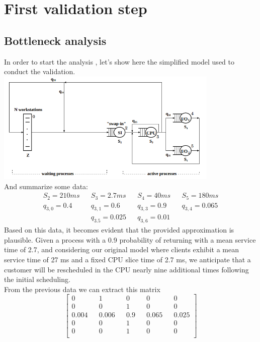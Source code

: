 \documentclass[12pt,a4paper]{article}
\begin{document}
    \section{First validation step}
    \subsection{Bottleneck analysis}
    In order to start the analysis , let's show here the simplified model 
    used to conduct the validation.
    \includegraphics[width=0.8\textwidth]{Images/simplified_model.png}
    \\And summarize some data:
    \begin{displaymath}
        \begin{aligned}
        S_2 = 210ms && S_3= 2.7ms && S_4 = 40ms && S_5=180ms\\
        q_{3,0}= 0.4&& q_{3,1}=0.6 && q_{3,3} = 0.9 && q_{3,4}= 0.065\\
        && q_{3.5}= 0.025 && q_{3,6}=0.01 && 
        \end{aligned}
    \end{displaymath}
    Based on this data, it becomes evident that the provided approximation is plausible. Given a process with a 0.9 probability of returning with a mean service time of 2.7, and considering our original model where clients exhibit a mean service time of 27 ms and a fixed CPU slice time of 2.7 ms, we anticipate that a customer will be rescheduled in the CPU nearly nine additional times following the initial scheduling. \\

    From the previous data we can extract this matrix 
    \begin{displaymath}
        \begin{bmatrix}
            0 && 1 && 0 && 0 && 0 \\
            0 && 0 && 1 && 0 && 0 \\
            0.004 && 0.006 && 0.9 && 0.065 && 0.025 \\
            0 && 0 && 1 && 0 && 0 \\
            0 && 0 && 1 && 0 && 0 \\
        \end{bmatrix}
    \end{displaymath}
\end{document}
